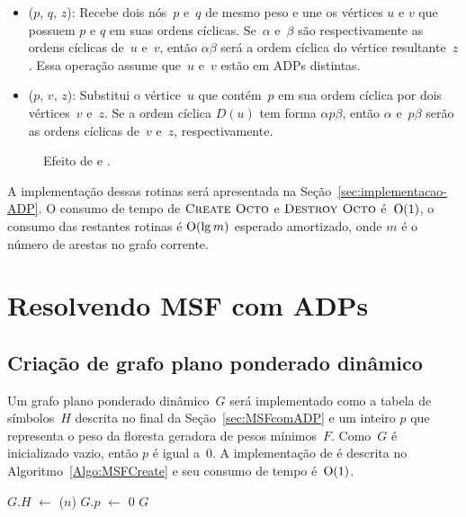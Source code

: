 \begin{itemize}
\item \LCOMerge($p$, $q$, $z$): Recebe dois nós~$p$ e~$q$ de mesmo peso e une os vértices $u$ e $v$ que possuem $p$ e $q$ em suas ordens cíclicas.
Se~$\alpha$ e~$\beta$ são respectivamente as ordens cíclicas de~$u$ e~$v$, então $\alpha\beta$ será a ordem cíclica do vértice resultante~$z$. 
Essa operação assume que~$u$ e~$v$ estão em ADPs distintas.

\item \LCOSplit($p$, $v$, $z$): Substitui o vértice~$u$ que contém~$p$ em sua ordem cíclica por dois vértices~$v$ e~$z$.
Se a ordem cíclica $D(u)$ tem forma $\alpha p\beta$, então $\alpha$ e~$p\beta$ serão as ordens cíclicas de~$v$ e~$z$, respectivamente.

\end{itemize}
\begin{figure}[htb]
\scalebox{1}{
\centering

}
\caption{Efeito de \LCOMerge{} e \LCOSplit{}.}
\label{fig:MSF-Merge-Split}
\end{figure}



A implementação dessas rotinas será apresentada na Seção~\ref{sec:implementacao-ADP}.
O consumo de tempo de $\text{\scshape Create Octo}$ e $\text{\scshape Destroy Octo}$ é~$\mathrm{O}(1)$, o consumo das restantes rotinas é $\mathrm{O}(\lg m)$ esperado amortizado, onde $m$ é o número de arestas no grafo corrente.

\section{Resolvendo MSF com ADPs}

\subsection{Criação de grafo plano ponderado dinâmico}

Um grafo plano ponderado dinâmico~$G$ será implementado como a tabela de símbolos~$H$ descrita no final da Seção~\ref{sec:MSFcomADP} e um inteiro $p$ que representa o peso da floresta geradora de pesos mínimos~$F$.
Como~$G$ é inicializado vazio, então $p$ é igual a~$0$.
A implementação de \MSFCreate{} é descrita no Algoritmo~\ref{Algo:MSFCreate} e seu consumo de tempo é~$\mathrm{O}(1)$.

\begin{algorithm}[htb]
\caption{\MSFCreate($n$)}
\label{Algo:MSFCreate}
\begin{algorithmic}[1]
\State $G.H$ $\gets$ \hashCreate($n$)
\State $G.p$ $\gets$ $0$
\State \Return $G$
\end{algorithmic}
\end{algorithm}

